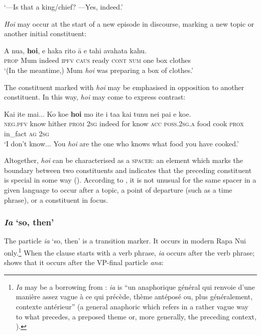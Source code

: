 \glt
‘—Is that a king/chief? —Yes, indeed.’ \textstyleExampleref{[R415.033]} 
\z

\textit{Ho{\ꞌ}i} may occur at the start of a new episode in discourse, marking a new topic or another initial constituent:

\ea\label{ex:4.168}
\gll A nua, \textbf{ho{\ꞌ}i}, e haka rito {\ꞌ}ā e tahi {\ꞌ}avahata kahu. \\
\textsc{prop} Mum indeed \textsc{ipfv} \textsc{caus} ready \textsc{cont} \textsc{num} one box clothes \\

\glt
‘(In the meantime,) Mum \textit{ho{\ꞌ}i} was preparing a box of clothes.’ \textstyleExampleref{[R210.027]} 
\z

The constituent marked with \textit{ho{\ꞌ}i} may be emphasised in opposition to another constituent. In this way, \textit{ho{\ꞌ}i} may come to express contrast:

\ea\label{ex:4.169}
\gll Kai {\ꞌ}ite mai... Ko koe \textbf{ho{\ꞌ}i} mo {\ꞌ}ite i ta{\ꞌ}a kai tunu nei  pa{\ꞌ}i e koe.\\
\textsc{neg.pfv} know hither \textsc{prom} \textsc{2sg} indeed for know \textsc{acc} \textsc{poss.2sg.a} food cook \textsc{prox}  in\_fact \textsc{ag} \textsc{2sg}\\

\glt
‘I don’t know... You \textit{ho{\ꞌ}i} are the one who knows what food you have cooked.’ \textstyleExampleref{[R236.029–030]}
\z

Altogether, \textit{ho{\ꞌ}i} can be characterised as a \textsc{spacer}: an element which marks the boundary between two constituents and indicates that the preceding constituent is special in some way (\citealt[37]{DooleyLevinsohn2001}). According to \citet[74]{Levinsohn2007}, it is not unusual for the same spacer in a given language to occur after a topic, a point of departure (such as a time phrase), or a constituent in focus.
\subsubsection{\textit{Ia} ‘so, then’}\label{sec:4.5.4.3}

The particle \textit{ia} ‘so, then’ is a transition marker. It occurs in modern Rapa Nui only.\footnote{\label{fn:204}\textit{Ia} may be a borrowing from :  \textit{ia} is “un anaphorique général qui renvoie d’une manière assez vague à ce qui précède, thème antéposé ou, plus généralement, contexte antérieur” (a general anaphoric which refers in a rather vague way to what precedes, a preposed theme or, more generally, the preceding context, \citealt[118]{LazardPeltzer2000}).} When the clause starts with a verb phrase, \textit{ia} occurs after the verb phrase;  shows that it occurs after the VP{}-final particle \textit{{\ꞌ}ana}:

